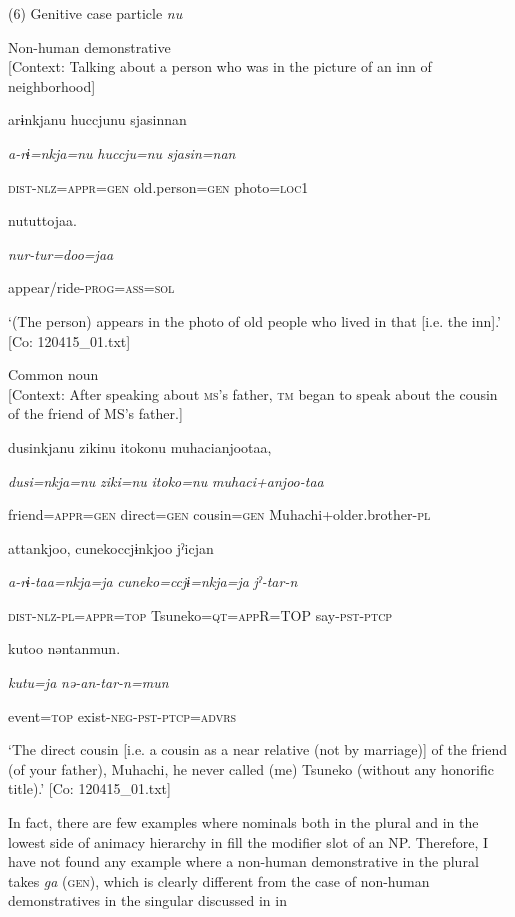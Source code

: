 (6)  Genitive case particle \textit{nu}

 \ea Non-human demonstrative\\{}
[Context: Talking about a person who was in the picture of an inn of neighborhood]

{\TM}
\gll arɨnkjanu  huccjunu  sjasinnan

      \textit{a-rɨ=nkja=nu}  \textit{huccju=nu}  \textit{sjasin=nan}

      \textsc{dist}-\textsc{nlz}=\textsc{appr}=\textsc{gen}  old.person=\textsc{gen}  photo=\textsc{loc}1

      nututtojaa.

      \textit{nur-tur=doo=jaa}

      appear/ride-\textsc{prog}=\textsc{ass}=\textsc{sol}

\glt ‘(The person) appears in the photo of old people who lived in that [i.e. the inn].’ [Co: 120415\_01.txt]
\z

 \ex Common noun\\{}
[Context: After speaking about \textsc{ms}’s father, \textsc{tm} began to speak about the cousin of the friend of MS’s father.]

{\TM}
\gll dusinkjanu  zikinu  {\textbar}itoko{\textbar}nu  muhacianjootaa,

      \textit{dusi=nkja=nu}  \textit{ziki=nu}  \textit{itoko=nu}  \textit{muhaci+anjoo-taa}

      friend=\textsc{appr}=\textsc{gen}  direct=\textsc{gen}  cousin=\textsc{gen}  Muhachi+older.brother-\textsc{pl}

      attankjoo,  cunekoccjɨnkjoo  jˀicjan

      \textit{a-rɨ-taa=nkja=ja}  \textit{cuneko=ccjɨ=nkja=ja}  \textit{jˀ-tar-n}

      \textsc{dist}-\textsc{nlz}-\textsc{pl}=\textsc{appr}=\textsc{top}  Tsuneko=\textsc{qt}=\textsc{app}R=TOP  say-\textsc{pst}-\textsc{ptcp}

      kutoo  nəntanmun.

      \textit{kutu=ja}  \textit{nə-an-tar-n=mun}

      event=\textsc{top}  exist-\textsc{neg}-\textsc{pst}-\textsc{ptcp}=\textsc{advrs}

\glt ‘The direct cousin [i.e. a cousin as a near relative (not by marriage)] of the friend (of your father), Muhachi, he never called (me) Tsuneko (without any honorific title).’ [Co: 120415\_01.txt]
\z

In fact, there are few examples where nominals both in the plural and in the lowest side of animacy hierarchy in  fill the modifier slot of an NP. Therefore, I have not found any example where a non-human demonstrative in the plural takes \textit{ga} (\textsc{gen}), which is clearly different from the case of non-human demonstratives in the singular discussed in  in 

